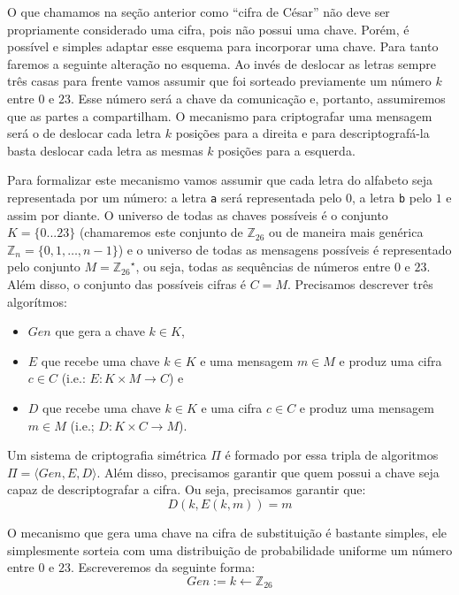 O que chamamos na seção anterior como ``cifra de César'' não deve ser propriamente considerado uma cifra, pois não possui uma chave.
Porém, é possível e simples adaptar esse esquema para incorporar uma chave.
Para tanto faremos a seguinte alteração no esquema.
Ao invés de deslocar as letras sempre três casas para frente vamos assumir que foi sorteado previamente um número $k$ entre $0$ e $23$.
Esse número será a chave da comunicação e, portanto, assumiremos que as partes a compartilham.
O mecanismo para criptografar uma mensagem será o de deslocar cada letra $k$ posições para a direita e para descriptografá-la basta deslocar cada letra as mesmas $k$ posições para a esquerda.

Para formalizar este mecanismo vamos assumir que cada letra do alfabeto seja representada por um número: a letra {\tt a} será representada pelo $0$, a letra {\tt b} pelo $1$ e assim por diante.
O universo de todas as chaves possíveis é o conjunto $K = \{0 ... 23\}$ (chamaremos este conjunto de $\mathbb{Z}_{26}$ ou de maneira mais genérica $\mathbb{Z}_n = \{0, 1, \dots, n - 1\}$) e o universo de todas as mensagens possíveis é representado pelo conjunto $M = {\mathbb{Z}_{26}}^\star$, ou seja, todas as sequências de números entre $0$ e $23$.
Além disso, o conjunto das possíveis cifras é $C = M$.
Precisamos descrever três algorítmos:
\begin{itemize}
\item $Gen$ que gera a chave $k \in K$,
\item $E$ que recebe uma chave $k \in K$ e uma mensagem $m \in M$ e produz uma cifra $c \in C$ (i.e.: $E: K \times M \to C$) e
\item $D$ que recebe uma chave $k \in K$ e uma cifra $c \in C$ e produz uma mensagem $m \in M$ (i.e.; $D: K \times C \to M$).
\end{itemize}

Um sistema de criptografia simétrica $\Pi$ é formado por essa tripla de algoritmos $\Pi = \langle Gen, E, D \rangle$.
Além disso, precisamos garantir que quem possui a chave seja capaz de descriptografar a cifra.
Ou seja, precisamos garantir que:
\begin{displaymath}
  D(k, E(k, m)) = m
\end{displaymath}

O mecanismo que gera uma chave na cifra de substituição é bastante simples, ele simplesmente sorteia com uma distribuição de probabilidade uniforme um número entre $0$ e $23$.
Escreveremos da seguinte forma:
\begin{displaymath}
Gen := k \leftarrow \mathbb{Z}_{26}
\end{displaymath}

